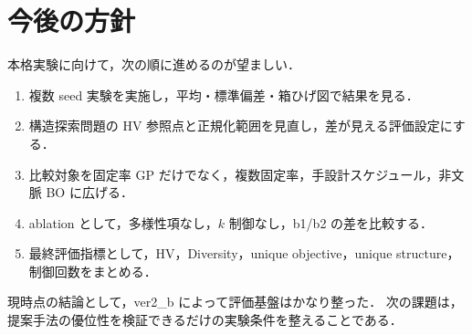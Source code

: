 \documentclass[a4paper,11pt]{ltjsarticle}
\begin{document}
\section{今後の方針}

本格実験に向けて，次の順に進めるのが望ましい．

\begin{enumerate}[leftmargin=3em]
  \item 複数 seed 実験を実施し，平均・標準偏差・箱ひげ図で結果を見る．
  \item 構造探索問題の HV 参照点と正規化範囲を見直し，差が見える評価設定にする．
  \item 比較対象を固定率 GP だけでなく，複数固定率，手設計スケジュール，非文脈 BO に広げる．
  \item ablation として，多様性項なし，\(k\) 制御なし，b1/b2 の差を比較する．
  \item 最終評価指標として，HV，Diversity，unique objective，unique structure，制御回数をまとめる．
\end{enumerate}

現時点の結論として，ver2\_b によって評価基盤はかなり整った．
次の課題は，提案手法の優位性を検証できるだけの実験条件を整えることである．
\end{document}
